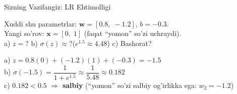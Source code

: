 \documentclass[aspectratio=169,11pt]{beamer}
\begin{document}
\begin{frame}{Sizning Vazifangiz: LR Ehtimolligi}
  \begin{tcolorbox}[warnbox,title=Vazifa (3 daqiqa)]
    \small
    Xuddi shu parametrlar:
    $\mathbf{w}=[0.8,\;{-}1.2]$,\; $b=-0.3$.\\[4pt]
    Yangi so'rov: $\mathbf{x}=[0,\;1]$
    \quad (faqat ``yomon'' so'zi uchraydi).\\[4pt]
    a)\; $z = ?$\qquad
    b)\; $\sigma(z)\approx ?$\quad ($e^{1.5}\approx 4.48$)\qquad
    c)\; Bashorat?
  \end{tcolorbox}
  \pause
  \begin{tcolorbox}[okbox,title=Javob]
    \small
    a)\; $z = 0.8(0)+(-1.2)(1)+(-0.3) = -1.5$\\[4pt]
    b)\; $\sigma(-1.5)=\dfrac{1}{1+e^{1.5}}
         \approx\dfrac{1}{5.48}\approx 0.182$\\[4pt]
    c)\; $0.182<0.5$
         $\Rightarrow$ \textcolor{deepred}{\textbf{salbiy}} \checkmark\quad
         \textcolor{halfgray}{\footnotesize
           (``yomon'' so'zi salbiy og'irlikka ega: $w_2=-1.2$)}
  \end{tcolorbox}
\end{frame}
\end{document}
